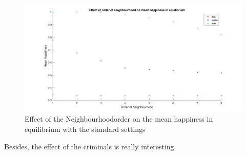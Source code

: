 \begin{figure}[H]
	\centering
    \includegraphics[width=\textwidth]{buurtorde-gemeindhappiness.pdf}
    \caption{Effect of the Neighbourhoodorder on the mean happiness in equilibrium with the standard settings}
    \label{fig:AantGenS}
\end{figure}

Besides, the effect of the criminals is really interesting.




